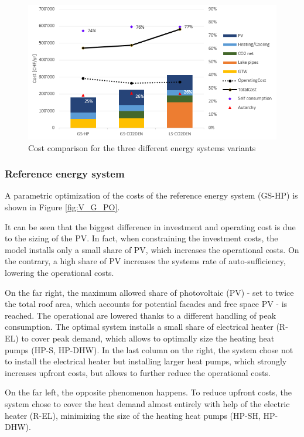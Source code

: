 \documentclass{article}
\begin{document}
\begin{figure}[htp]
	\centering
	\includegraphics[width=1\textwidth]{V_costs.PNG}
	\caption{Cost comparison for the three different energy systems variants}
	\label{fig:V_costs}
\end{figure}


\subsubsection{Reference energy system}
A parametric optimization of the costs of the reference energy system (GS-HP) is shown in Figure \ref{fig:V_G_PO}.

It can be seen that the biggest difference in investment and operating cost is due to the sizing of the PV. In fact, when constraining the investment costs, the model installs only a small share of PV, which increases the operational costs. On the contrary, a high share of PV increases the systems rate of auto-sufficiency, lowering the operational costs. 

On the far right, the maximum allowed share of photovoltaic (PV) - set to twice the total roof area, which accounts for potential facades and free space PV - is reached. The operational are lowered thanks to a different handling of peak consumption. The optimal system installs a small share of electrical heater (R-EL) to cover peak demand, which allows to optimally size the heating heat pumps (HP-S, HP-DHW). In the last column on the right, the system chose not to install the electrical heater but installing larger heat pumps, which strongly increases upfront costs, but allows to further reduce the operational costs.

On the far left, the opposite phenomenon happens. To reduce upfront costs, the system chose to cover the heat demand almost entirely with help of the electric heater (R-EL), minimizing the size of the heating heat pumps (HP-SH, HP-DHW).
\end{document}
